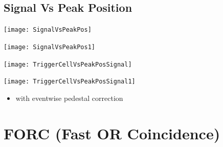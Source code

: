 \documentclass[9pt]{beamer}
\begin{document}
\subsection{Signal Vs Peak Position}
\begin{frame}
	\begin{center}
		\begin{minipage}{5.5cm}
			\centering
			\texttt{[image: SignalVsPeakPos]}
		\end{minipage}
		\hspace*{2pt}
		\begin{minipage}{5.5cm}
			\centering
			\texttt{[image: SignalVsPeakPos1]}
		\end{minipage}\no\s
	\end{center}
\end{frame}
\begin{frame}
	\begin{center}
		\begin{minipage}{5.5cm}
			\centering
			\texttt{[image: TriggerCellVsPeakPosSignal]}
		\end{minipage}
		\hspace*{2pt}
		\begin{minipage}{5.5cm}
			\centering
			\texttt{[image: TriggerCellVsPeakPosSignal1]}
		\end{minipage}\no\s
	\end{center}
	\begin{itemize}
		\item with eventwise pedestal correction
	\end{itemize}
\end{frame}
\section{FORC (Fast OR Coincidence)}
\end{document}
